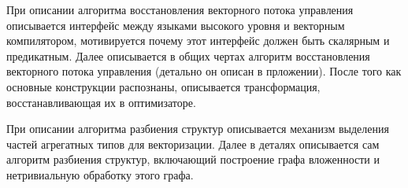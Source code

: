 При описании алгоритма восстановления векторного потока управления описывается интерфейс между языками высокого уровня и векторным компилятором, мотивируется почему этот интерфейс должен быть скалярным и предикатным. Далее описывается в общих чертах алгоритм восстановления векторного потока управления (детально он описан в прложении). После того как основные конструкции распознаны, описывается трансформация, восстанавливающая их в оптимизаторе.

При описании алгоритма разбиения структур описывается механизм выделения частей агрегатных типов для векторизации. Далее в деталях описывается сам алгоритм разбиения структур, включающий построение графа вложенности и нетривиальную обработку этого графа.

\FloatBarrier